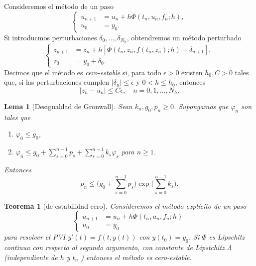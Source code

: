 \documentclass[11pt,letterpaper]{report}
\newtheorem{theorem}{Teorema}
\newtheorem{lemma}{Lema}
\renewcommand\phi\varphi
\begin{document}
Consideremos el método de un paso
\begin{equation}
  \left\{
    \begin{aligned}
      u_{n+1} &= u_n + h\Phi(t_n,u_n,f_n;h),
      \\
      u_0 &= y_0.
    \end{aligned}
  \right.
\end{equation}
Si introducmos perturbaciones $\delta_0,\dots,\delta_{N_h}$,
obtendremos un método perturbado
\begin{equation}
  \left\{
    \begin{aligned}
      z_{n+1} &= z_n + h[\Phi(t_n,z_n,f(t_n,z_n);h) + \delta_{n+1}],
      \\
      z_0 &= y_0 + \delta_0.
    \end{aligned}
  \right.
\end{equation}
Decimos que el método es \emph{cero-estable} si, para todo
$\epsilon>0$ existen $h_0,C>0$ tales que, si las perturbaciones
cumplen $|\delta_n|\leq\epsilon$ y $0<h\leq h_0$, entonces
\begin{equation}
  |z_n - u_n| \leq C\epsilon, \quad n=0,1,\dots,N_h
.\end{equation}

\begin{lemma}[Desigualdad de Gronwall]
  Sean $k_n,g_0,p_n\geq 0$. Supongamos que $\phi_n$ son tales que
  \begin{enumerate}
    \item
      $\phi_0\leq g_0$,
    \item
      $\phi_n\leq
      g_0+\sum_{s=0}^{n-1}p_s+\sum_{s=0}^{n-1}k_s\phi_s$ para $n\geq
      1$.
  \end{enumerate}
  Entonces
  \begin{equation}
    p_n \leq
    \Big(g_0+\sum_{s=0}^{n-1}p_s\Big)
    \exp\Big(\sum_{s=0}^{n-1}k_s\Big)
  .\end{equation}
\end{lemma}

\begin{theorem}[de estabilidad cero]
  Consideremos el método explícito de un paso
  \begin{equation}
    \left\{
      \begin{aligned}
        u_{n+1} &= u_n + h\Phi(t_n,u_n,f_n;h)
        \\
        u_0 &= y_0
      \end{aligned}
    \right.
  \end{equation}
  para resolver el PVI $y'(t)=f(t,y(t))$ con $y(t_0)=y_0$.
  Si $\Phi$ es Lipschitz continua con respecto al segundo argumento,
  con constante de Lipstchitz $\Lambda$ (independiente de $h$ y $t_n$
  ) entonces el método es cero-estable.
\end{theorem}
\end{document}
